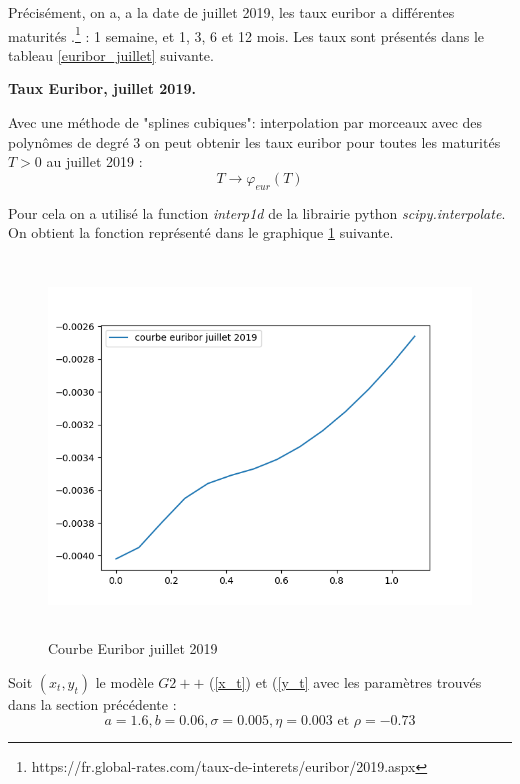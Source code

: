 \documentclass[12pt, a4paper]{book}
\begin{document}
Précisément, on a, a la date de juillet 2019, les taux euribor a différentes maturités .\footnote{https://fr.global-rates.com/taux-de-interets/euribor/2019.aspx} : 1 semaine, et 1, 3, 6 et 12 mois. Les taux sont présentés dans le tableau \ref{euribor_juillet} suivante.

\begin{table}[h!]
	\caption{\bf Taux Euribor, juillet 2019.}
	\bigskip	
	\label{euribor_juillet}
	\centering
\end{table}

Avec une méthode de "splines cubiques": interpolation par morceaux avec des polynômes de degré 3 on peut obtenir les taux euribor pour toutes les maturités $T>0$ au juillet 2019 :
$$T \rightarrow \varphi_{eur}(T) $$

 Pour cela on a utilisé la function {\it interp1d} de la librairie python {\it scipy.interpolate}. On obtient la fonction représenté dans le graphique \ref{courbeEuribor} suivante.


\begin{figure}[!h]
\label{courbeEuribor}
\centering
\includegraphics[height=10cm,width=16cm]{courbeEuribor.png}
\caption{Courbe Euribor juillet 2019}
\end{figure}

Soit $(x_t, y_t)$ le modèle  $G2++$ (\ref{x_t}) et (\ref{y_t} avec les paramètres trouvés dans la section précédente :
\begin{equation}\label{parametros}
a = 1.6, b=0.06, \sigma=0.005, \eta=0.003 \mbox{ et } \rho=-0.73
\end{equation}
\end{document}

